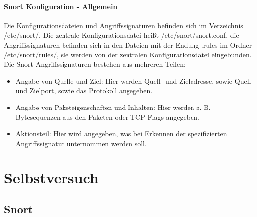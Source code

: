 \documentclass[a4paper]{report}
\begin{document}
\subsubsection{Snort Konfiguration - Allgemein}
Die Konfigurationsdateien und Angriffssignaturen befinden sich im Verzeichnis /etc/snort/. Die zentrale Konfigurationsdatei heißt /etc/snort/snort.conf, die
Angriffssignaturen befinden sich in den Dateien mit der Endung .rules im Ordner
/etc/snort/rules/, sie werden von der zentralen Konfigurationsdatei eingebunden.
Die Snort Angriffssignaturen bestehen aus mehreren Teilen:
\begin{itemize}
\item Angabe von Quelle und Ziel:
Hier werden Quell- und Zieladresse, sowie Quell- und Zielport, sowie das Protokoll
angegeben.
\item Angabe von Paketeigenschaften und Inhalten:
Hier werden z. B. Bytesequenzen aus den Paketen oder TCP Flags angegeben.
\item Aktionsteil:
Hier wird angegeben, was bei Erkennen der spezifizierten Angriffssignatur
unternommen werden soll.
\end{itemize}

\chapter{Selbstversuch}

\section{Snort}
\end{document}
